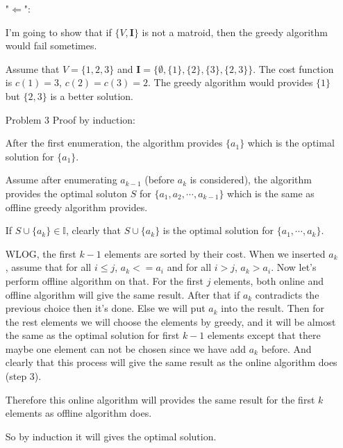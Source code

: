 \documentclass{article}
\begin{document}
\begin{itemize}
        "$\Leftarrow$": 

        I'm going to show that if $\{V, \mathbf{I}\}$ is not 
        a matroid, then the greedy algorithm would fail sometimes.

        Assume that $V = \{1, 2, 3\}$ and 
        $\mathbf{I} = \{\emptyset, \{1\}, \{2\}, \{3\}, \{2, 3\}\}$. 
        The cost function is $c(1) = 3$, $c(2) = c(3) = 2$.
        The greedy algorithm would provides $\{1\}$ but $\{2, 3\}$ is
        a better solution.

    \item[Problem 3]
        Proof by induction:

        After the first enumeration, 
        the algorithm provides $\{a_1\}$ which is the optimal
        solution for $\{a_1\}$.

        Assume after enumerating $a_{k - 1}$ 
        (before $a_k$ is considered), the algorithm
        provides the optimal soluton $S$ 
        for $\{a_1, a_2, \cdots, a_{k - 1}\}$ which is the same as
        offline greedy algorithm provides.

        If $S \cup \{a_k\} \in \mathbb{I}$, clearly that
        $S \cup \{a_k\}$ is the optimal solution for $\{a_1, \cdots, a_k\}$.

        WLOG, the first $k-1$ elements are sorted by their cost.
        When we inserted $a_k$, assume that for all $i \leq j$, 
        $a_k <= a_i$ and for all $i > j$, $a_k > a_i$.
        Now let's perform offline algorithm on that.
        For the first $j$ elements, both online and offline algorithm
        will give the same result. After that if $a_k$ contradicts the 
        previous choice then it's done. Else we will put $a_k$ into the
        result. Then for the rest elements we will choose the elements
        by greedy, and it will be almost the same as the optimal solution 
        for first $k-1$ elements except that there maybe one element can
        not be chosen since we have add $a_k$ before. 
        And clearly that this process will give the same result as the
        online algorithm does (step 3).

        Therefore this online algorithm will provides the same result
        for the first $k$ elements as offline algorithm does.

        So by induction it will gives the optimal solution.

\end{itemize}
\end{document}
